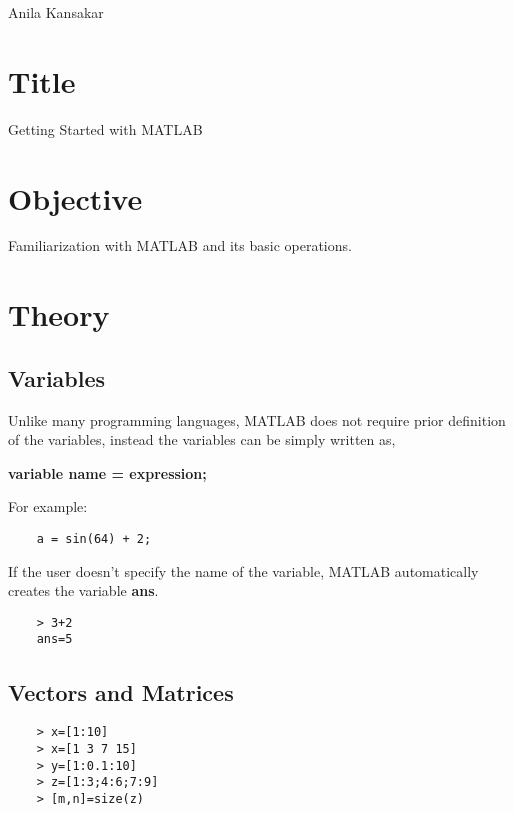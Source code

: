 \documentclass[a4paper,11pt]{article}
\begin{document}
{Anila  Kansakar}

\renewcommand{\contentsname}{Table of Contents}
\tableofcontents

\pagebreak
\lstlistoflistings
\vspace{10em}
\listoffigures
\listoftables
\pagebreak
{}

\section{Title} {\large Getting Started with MATLAB }
\section{Objective}
Familiarization with MATLAB and its basic operations.




\section{Theory}
\subsection{Variables}
Unlike many programming languages, MATLAB does not require prior definition of the variables, instead the variables can be simply written as,

\textbf{variable name = expression;}

For example:

\begin{verbatim}
    a = sin(64) + 2;
\end{verbatim}
If the user doesn't specify the name of the variable, MATLAB automatically creates the
variable \textbf{ans}.
\begin{verbatim}
    > 3+2
    ans=5
\end{verbatim}


\subsection{Vectors and Matrices}
\begin{verbatim}
    > x=[1:10]
    > x=[1 3 7 15]
    > y=[1:0.1:10]
    > z=[1:3;4:6;7:9]
    > [m,n]=size(z)
\end{verbatim}
\end{document}
